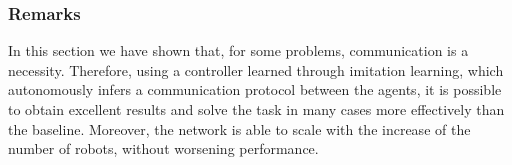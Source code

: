 \subsubsection{Remarks}
\label{subsubsec:remarks-task2-comm}

In this section we have shown that, for some problems, communication is a 
necessity. 
Therefore, using a controller learned through imitation learning, which 
autonomously infers a communication protocol between the agents, it is possible 
to obtain excellent results and solve the task in many cases more effectively than 
the baseline.
Moreover, the network is able to scale with the increase of the number of robots, 
without worsening performance.
